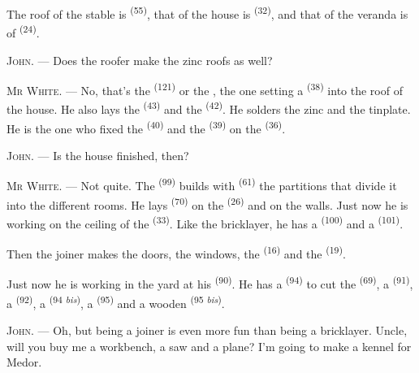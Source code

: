The roof of the stable is  \textsuperscript{(55)}, that of the house is
 \textsuperscript{(32)}, and that of the veranda is of
 \textsuperscript{(24)}.

\textsc{John}. --- Does the roofer make the zinc roofs as well?

\textsc{Mr White}. --- No, that's the  \textsuperscript{(121)} or the
, the one setting a  \textsuperscript{(38)} into the
roof of the house. He also lays the  \textsuperscript{(43)} and the
 \textsuperscript{(42)}. He solders the zinc and the tinplate. He is the one
who fixed the  \textsuperscript{(40)} and the 
\textsuperscript{(39)} on the
 \textsuperscript{(36)}.

\textsc{John}. --- Is the house finished, then?

\VUsaut{3.0mm}
\VUsaut{3.0mm}

\textsc{Mr White}. --- Not quite. The  \textsuperscript{(99)} builds with
 \textsuperscript{(61)} the partitions that divide it into the different rooms.
He lays  \textsuperscript{(70)} on the
 \textsuperscript{(26)} and on the walls. Just now he is working on the ceiling
of the  \textsuperscript{(33)}. Like the bricklayer, he has a
 \textsuperscript{(100)} and a  \textsuperscript{(101)}.

Then the joiner makes the doors, the windows, the 
\textsuperscript{(16)} and the  \textsuperscript{(19)}.

Just now he is working in the yard at his  \textsuperscript{(90)}. He has a
 \textsuperscript{(94)} to cut the  \textsuperscript{(69)}, a
 \textsuperscript{(91)}, a  \textsuperscript{(92)}, a
 \textsuperscript{(94 \textit{bis})}, a
 \textsuperscript{(95)} and a wooden 
\textsuperscript{(95 \textit{bis})}.

\textsc{John}. --- Oh, but being a joiner is even more fun than being a bricklayer. Uncle,
will you buy me a workbench, a saw and a plane? I'm going to make a kennel for Medor.

